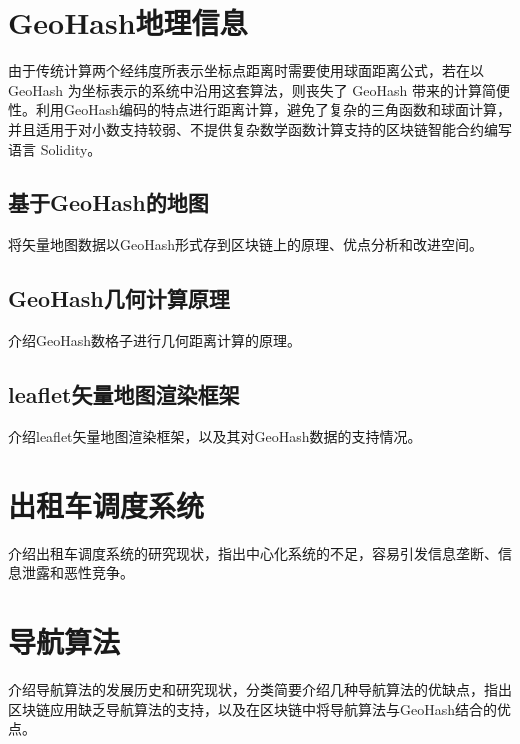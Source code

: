 \section{GeoHash地理信息}
由于传统计算两个经纬度所表示坐标点距离时需要使用球面距离公式，若在以 GeoHash 为坐标表示的系统中沿用这套算法，则丧失了 GeoHash 带来的计算简便性。利用GeoHash编码的特点进行距离计算，避免了复杂的三角函数和球面计算，并且适用于对小数支持较弱、不提供复杂数学函数计算支持的区块链智能合约编写语言 Solidity。
\subsection{基于GeoHash的地图}
将矢量地图数据以GeoHash形式存到区块链上的原理、优点分析和改进空间。
\subsection{GeoHash几何计算原理}
介绍GeoHash数格子进行几何距离计算的原理。
\subsection{leaflet矢量地图渲染框架}
介绍leaflet矢量地图渲染框架，以及其对GeoHash数据的支持情况。

\section{出租车调度系统}
介绍出租车调度系统的研究现状，指出中心化系统的不足，容易引发信息垄断、信息泄露和恶性竞争。
\section{导航算法}
介绍导航算法的发展历史和研究现状，分类简要介绍几种导航算法的优缺点，指出区块链应用缺乏导航算法的支持，以及在区块链中将导航算法与GeoHash结合的优点。
